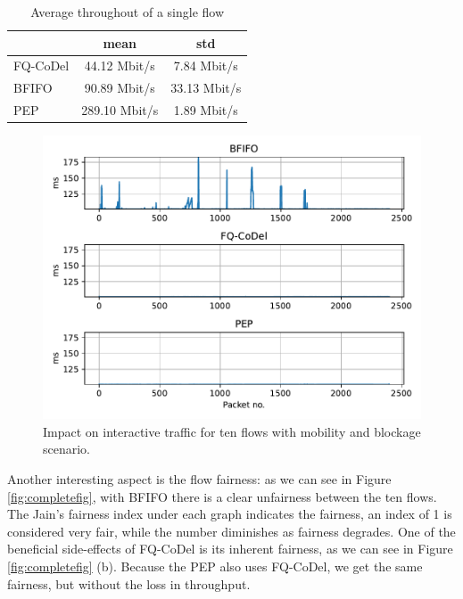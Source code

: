 \documentclass[a4paper,english, 12pt]{report}
\begin{document}
\begin{table}[h!]
\centering
\begin{tabular}{l|c|c}
\hline
 & \textbf{mean} & \textbf{std} \\ 
\hline
FQ-CoDel & 44.12 Mbit/s      & 7.84 Mbit/s \\
BFIFO    & 90.89 Mbit/s      & 33.13 Mbit/s  \\
PEP      & 289.10 Mbit/s      & 1.89 Mbit/s   \\
\hline
\end{tabular}
\caption{Average throughout of a single flow}
\label{tab:throughput_10flows_table}
\end{table}

\begin{figure}[!h!] %
	\centering
	\includegraphics[scale=0.65]{../diagrams/witestlab/throughput/10flows/latency.pdf}
  	\caption{Impact on interactive traffic for ten flows with mobility and blockage scenario.}
  	\label{fig:latency_10_flows}
\end{figure}

Another interesting aspect is the flow fairness: as we can see in Figure \ref{fig:completefig}, with BFIFO there is a clear unfairness between the ten flows. The Jain's fairness index under each graph indicates the fairness, an index of 1 is considered very fair, while the number diminishes as fairness degrades. One of the beneficial side-effects of FQ-CoDel is its inherent fairness, as we can see in Figure \ref{fig:completefig} (b). Because the PEP also uses FQ-CoDel, we get the same fairness, but without the loss in throughput.\\
\end{document}
